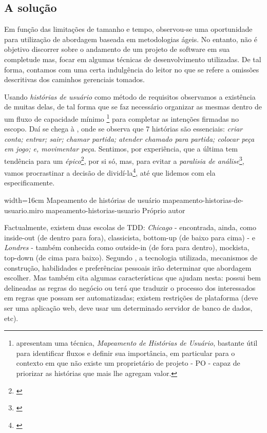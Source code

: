 \subsection{A solução}

  Em função das limitações de tamanho e tempo, observou-se uma oportunidade para utilização de abordagem baseada em metodologias ágeis. No entanto, não é objetivo discorrer sobre o andamento de um projeto de software em sua completude mas, focar em algumas técnicas de desenvolvimento utilizadas. De tal forma, contamos com uma certa indulgência do leitor no que se refere a omissões descritivas dos caminhos gerenciais tomados.

  Usando \emph{histórias de usuário} como método de requisitos observamos a existência de muitas delas, de tal forma que se faz necessário organizar as mesmas dentro de um fluxo de capacidade mínimo \footnote{ apresentam uma técnica, \emph{Mapeamento de Histórias de Usuário}, bastante útil para identificar fluxos e definir sua importância, em particular para o contexto em que não existe um proprietário de projeto - PO - capaz de priorizar as histórias que mais lhe agregam valor.} para completar as intenções firmadas no escopo. Daí se chega à , onde se observa que 7 histórias são essenciais: \emph{criar conta; entrar; sair; chamar partida; atender chamado para partida; colocar peça em jogo; e, movimentar peça}. Sentimos, por experiência, que a última tem tendência para um \emph{épico}\footnote{\cite[pág. 6]{Cohn2004}}, por si só, mas,  para evitar a \emph{paralisia de análise}\footnote{\cite[pág. 71]{Pugh2011}}, vamos procrastinar a decisão de dividí-la\footnote{\cite[pág. 24]{Cohn2004}}, até que lidemos com ela especificamente.

  \imagem
    {width=16cm}
    {Mapeamento de histórias de usuário}
    {mapeamento-historias-de-usuario.miro}
    {mapeamento-historias-usuario}
    {Próprio autor\footnotemark}

  Factualmente, existem duas escolas de TDD: \emph{Chicago} - encontrada, ainda, como inside-out (de dentro para fora), classicista, bottom-up (de baixo para cima) - e \emph{Londres} - também conhecida como outside-in (de fora para dentro), mockista, top-down (de cima para baixo). Segundo , a tecnologia utilizada, mecanismos de construção, habilidades e preferências pessoais irão determinar que abordagem escolher. Mas também cita algumas características que ajudam nesta: possui bem delineadas as regras do negócio ou terá que traduzir o processo dos interessados em regras que possam ser automatizadas; existem restrições de plataforma (deve ser uma aplicação web, deve usar um determinado servidor de banco de dados, etc).

